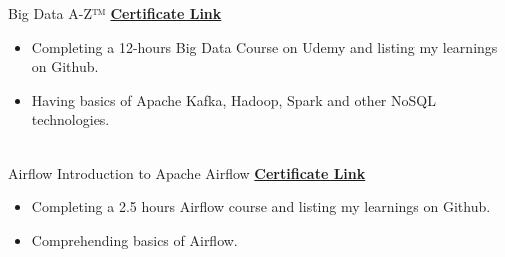 \documentclass[letterpaper]{DS_class_file} %
\begin{document}
\begin{twenty}
	{\hspace{0.3cm}Big Data A-Z™}
	{\href{https://www.udemy.com/certificate/UC-4a851250-cc99-4a9d-8f7c-d8a32ed0a832/}{\textbf{Certificate Link}}}
	{}
	{
		{\begin{itemize}
				\item Completing a 12-hours Big Data Course on Udemy and listing my learnings on Github.
				\item Having basics of Apache Kafka, Hadoop, Spark and other NoSQL technologies.
		\end{itemize}}
	}
	\\
	\twentyitem
	{Airflow}
	{}
	{\hspace{0.3cm}Introduction to Apache Airflow}
	{\href{https://www.udemy.com/certificate/UC-634f3164-fcb1-4bdf-b5b0-909134dd3252/}{\textbf{Certificate Link}}}
	{}
	{
		{\begin{itemize}
				\item Completing a 2.5 hours Airflow course and listing my learnings on Github.
				\item Comprehending basics of Airflow.
		\end{itemize}}
	}
	

	
\end{twenty}



	
\end{document}
